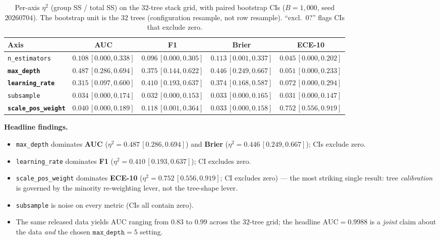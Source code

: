\begin{table}[t]
\centering\small
\caption{Per-axis $\eta^2$ (group SS / total SS) on the $32$-tree
stack grid, with paired bootstrap CIs ($B{=}1{,}000$, seed $20260704$).
The bootstrap unit is the $32$ trees (configuration resample, not row
resample). ``excl.\ 0?'' flags CIs that exclude zero.}
\label{tab:p8-stack-eta2}
\begin{tabular}{lcccc}
\toprule
Axis & AUC & F1 & Brier & ECE-10 \\
\midrule
\texttt{n\_estimators}     & $0.108\,[0.000,0.338]$ & $0.096\,[0.000,0.305]$ & $0.113\,[0.001,0.337]$ & $0.045\,[0.000,0.202]$ \\
\textbf{\texttt{max\_depth}}       & $\mathbf{0.487\,[0.286,0.694]}$ & $\mathbf{0.375\,[0.144,0.622]}$ & $\mathbf{0.446\,[0.249,0.667]}$ & $0.051\,[0.000,0.233]$ \\
\textbf{\texttt{learning\_rate}}   & $\mathbf{0.315\,[0.097,0.600]}$ & $\mathbf{0.410\,[0.193,0.637]}$ & $\mathbf{0.374\,[0.168,0.587]}$ & $0.072\,[0.000,0.294]$ \\
\texttt{subsample}         & $0.034\,[0.000,0.174]$ & $0.032\,[0.000,0.153]$ & $0.033\,[0.000,0.165]$ & $0.031\,[0.000,0.147]$ \\
\textbf{\texttt{scale\_pos\_weight}} & $0.040\,[0.000,0.189]$ & $\mathbf{0.118\,[0.001,0.364]}$ & $0.033\,[0.000,0.158]$ & $\mathbf{0.752\,[0.556,0.919]}$ \\
\bottomrule
\end{tabular}
\end{table}

\textbf{Headline findings.}
\begin{itemize}
\item \texttt{max\_depth} dominates \textbf{AUC} ($\eta^2{=}0.487\,[0.286,0.694]$)
  and \textbf{Brier} ($\eta^2{=}0.446\,[0.249,0.667]$); CIs exclude zero.
\item \texttt{learning\_rate} dominates \textbf{F1} ($\eta^2{=}0.410\,[0.193,0.637]$);
  CI excludes zero.
\item \texttt{scale\_pos\_weight} dominates \textbf{ECE-10}
  ($\eta^2{=}0.752\,[0.556,0.919]$; CI excludes zero) — the most striking
  single result: tree \emph{calibration} is governed by the minority
  re-weighting lever, not the tree-shape lever.
\item \texttt{subsample} is noise on every metric (CIs all contain zero).
\item The same released data yields AUC ranging from $0.83$ to $0.99$
  across the $32$-tree grid; the headline $\mathrm{AUC}{=}0.9988$ is
  a \emph{joint} claim about the data \emph{and} the chosen
  $\texttt{max\_depth}{=}5$ setting.
\end{itemize}

